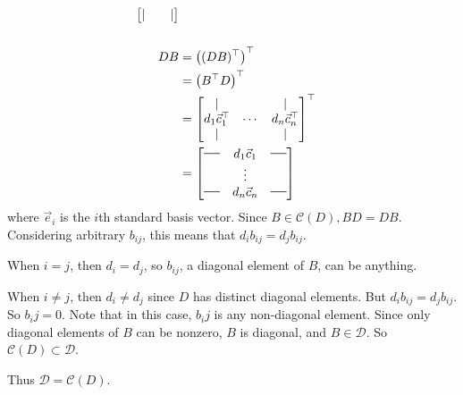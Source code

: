 \documentclass[12pt]{exam}
\newcommand{\transpose}{^\top}
\begin{document}
\begin{questions}
\begin{parts}
\begin{solution}
\begin{align*}
\begin{bmatrix}
                            \mid &  & \mid
                        \end{bmatrix} \\\\
                        DB &=\left((DB)\transpose\right)\transpose \\
                        &= \left(B\transpose D\right)\transpose \\
                        &= \begin{bmatrix}
                            \mid &  & \mid \\
                            d_1 \vec c_1\transpose  & \cdots & d_n \vec c_n\transpose \\
                            \mid &  & \mid
                        \end{bmatrix}\transpose \\
                        &= \begin{bmatrix}
                            \rule[3pt]{0.45cm}{0.5pt} & d_1 \vec c_1 & \rule[3pt]{0.45cm}{0.5pt} \\
                             & \vdots & \\
                            \rule[3pt]{0.45cm}{0.5pt} & d_n \vec c_n & \rule[3pt]{0.45cm}{0.5pt}
                        \end{bmatrix}
                    \end{align*}
                where $\vec e_i$ is the $i$th standard basis vector. Since $B \in \mathscr C(D), BD = DB$. Considering arbitrary $b_{ij}$, this means that $d_i b_{ij} = d_j b_{ij}$. 
                \par When $i=j$, then $d_i = d_j$, so $b_{ij}$, a diagonal element of $B$, can be anything.
                \par When $i \neq j$, then $d_i \neq d_j$ since $D$ has distinct diagonal elements. But $d_i b_{ij} = d_j b_{ij}$. So $b_ij = 0$. Note that in this case, $b_ij$ is any non-diagonal element.
                Since only diagonal elements of $B$ can be nonzero, $B$ is diagonal, and $B \in \mathscr D$. So $\mathscr C(D) \subset \mathscr D$.
                \par Thus $\mathscr D = \mathscr C(D).$ 
            \end{solution}

\end{parts}
\end{questions}
\end{document}
